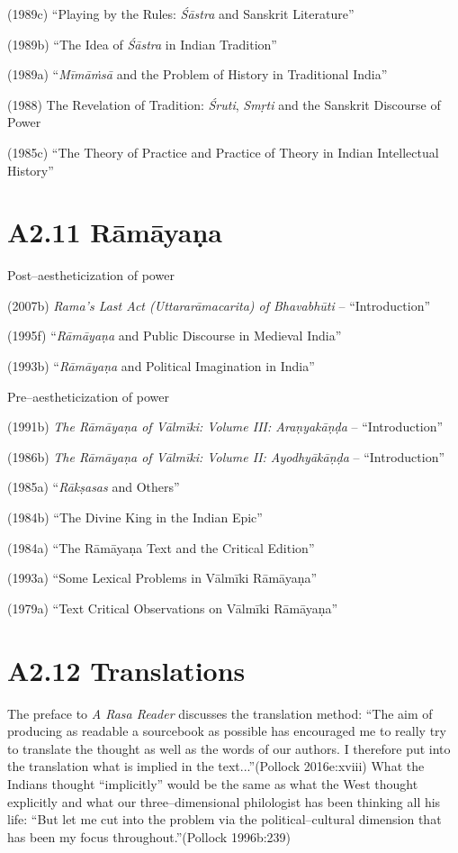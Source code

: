 (1989c) “Playing by the Rules: \textit{Śāstra} and Sanskrit Literature”

(1989b) “The Idea of \textit{Śāstra} in Indian Tradition”

(1989a) “\textit{Mīmāṁsā} and the Problem of History in Traditional India”

(1988) The Revelation of Tradition: \textit{Śruti}, \textit{Smṛti} and the Sanskrit Discourse of Power 

(1985c) “The Theory of Practice and Practice of Theory in Indian Intellectual History”


\section*{A2.11 Rāmāyaṇa}

Post–aestheticization of power

(2007b) \textit{Rama's Last Act (Uttararāmacarita) of Bhavabhūti} – “Introduction”

(1995f) “\textit{Rāmāyaṇa} and Public Discourse in Medieval India”

(1993b) “\textit{Rāmāyaṇa} and Political Imagination in India”

Pre–aestheticization of power

(1991b) \textit{The Rāmāyaṇa of Vālmīki: Volume III: Araṇyakāṇḍa} – “Introduction”

(1986b) \textit{The Rāmāyaṇa of Vālmīki: Volume II: Ayodhyākāṇḍa} – “Introduction”

(1985a) “\textit{Rākṣasas} and Others”

(1984b) “The Divine King in the Indian Epic”

(1984a) “The Rāmāyaṇa Text and the Critical Edition”

(1993a) “Some Lexical Problems in Vālmīki Rāmāyaṇa”

(1979a) “Text Critical Observations on Vālmīki Rāmāyaṇa”


\section*{A2.12 Translations}

The preface to \textit{A Rasa Reader} discusses the translation method: “The aim of producing as readable a sourcebook as possible has encouraged me to really try to translate the thought as well as the words of our authors. I therefore put into the translation what is implied in the text...”(Pollock 2016e:xviii) What the Indians thought “implicitly” would be the same as what the West thought explicitly and what our three–dimensional philologist has been thinking all his life: “But let me cut into the problem via the political–cultural dimension that has been my focus throughout.”(Pollock 1996b:239)

